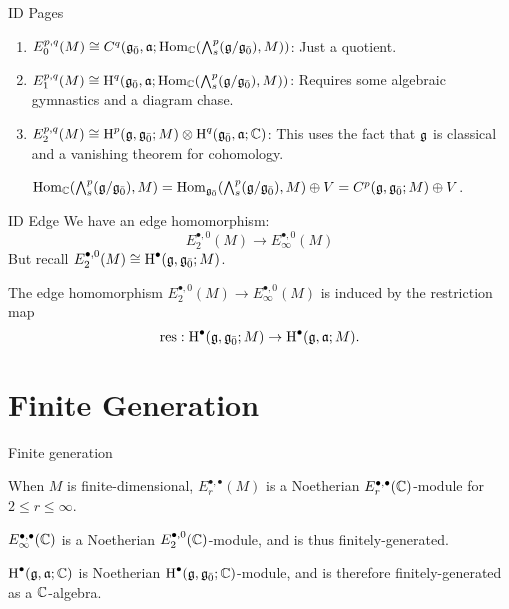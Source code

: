 \documentclass{beamer}
\begin{document}
\begin{frame}{ID Pages}
  \begin{enumerate}
  \pause\item $E_0^{p,q}(M) \cong C^q({\mathfrak{g}}_{\bar{0}},\mathfrak{a};\operatorname{Hom}_{\mathbb{C}}(\bigwedge\nolimits^{p}_s(\mathfrak{g}/{\mathfrak{g}}_{\bar{0}}),M))$: Just a quotient.
    \vspace{0.2in}
  \pause\item $E_1^{p,q}(M) \cong \operatorname{H}^q({\mathfrak{g}}_{\bar{0}},\mathfrak{a};\operatorname{Hom}_{\mathbb{C}}(\bigwedge\nolimits^{p}_s(\mathfrak{g}/{\mathfrak{g}}_{\bar{0}}),M))$: Requires some algebraic gymnastics and a diagram chase.
    \vspace{0.2in}
  \pause\item $E_2^{p,q}(M) \cong \operatorname{H}^p(\mathfrak{g},{\mathfrak{g}}_{\bar{0}};M) \otimes \operatorname{H}^q({\mathfrak{g}}_{\bar{0}},\mathfrak{a};\mathbb{C})$: This uses the fact that $\mathfrak{g}$ is classical and a vanishing theorem for cohomology.
    
   $\operatorname{Hom}_{\mathbb{C}}(\bigwedge\nolimits^{p}_s(\mathfrak{g}/{\mathfrak{g}}_{\bar{0}}),M) = \operatorname{Hom}_{{\mathfrak{g}}_{\bar{0}}}(\bigwedge\nolimits^{p}_s(\mathfrak{g}/{\mathfrak{g}}_{\bar{0}}),M) \oplus V = C^p(\mathfrak{g},{\mathfrak{g}}_{\bar{0}};M) \oplus V$. 
  \end{enumerate}
\end{frame}

\begin{frame}{ID Edge}
  \pause
  We have an edge homomorphism:
  \[
    {E_2^{\bullet,0}(M)} \to E_\infty^{\bullet,0}(M)
  \]\pause
  But recall $E_2^{\bullet,0}(M) \cong \operatorname{H}^\bullet(\mathfrak{g},{\mathfrak{g}}_{\bar{0}};M)$.
\pause
  \begin{theorem}
    The edge homomorphism $E_2^{\bullet,0}(M) \to E_\infty^{\bullet,0}(M)$ is induced by the restriction map
    \[
      \operatorname{res}:\operatorname{H}^\bullet(\mathfrak{g},{\mathfrak{g}}_{\bar{0}};M) \to \operatorname{H}^\bullet(\mathfrak{g},\mathfrak{a};M).
    \]
    
  \end{theorem}
\end{frame}

\section{Finite Generation}

\begin{frame}{Finite generation}
  \pause
  \begin{theorem}
    When $M$ is finite-dimensional, $E_r^{\bullet,\bullet}(M)$ is a Noetherian $E_r^{\bullet,\bullet}(\mathbb{C})$-module for $2 \leq r \leq \infty$.
  \end{theorem}
  \pause
  \begin{corollary}
    $E_\infty^{\bullet,\bullet}(\mathbb{C})$ is a Noetherian $E_2^{\bullet,0}(\mathbb{C})$-module, and is thus finitely-generated.
  \end{corollary}
  \pause
  \begin{corollary}
    $\operatorname{H}^\bullet(\mathfrak{g},\mathfrak{a};\mathbb{C})$ is Noetherian $\operatorname{H}^\bullet(\mathfrak{g},{\mathfrak{g}}_{\bar{0}};\mathbb{C})$-module, and is therefore finitely-generated as a $\mathbb{C}$-algebra.
  \end{corollary}
\end{frame}
\end{document}
